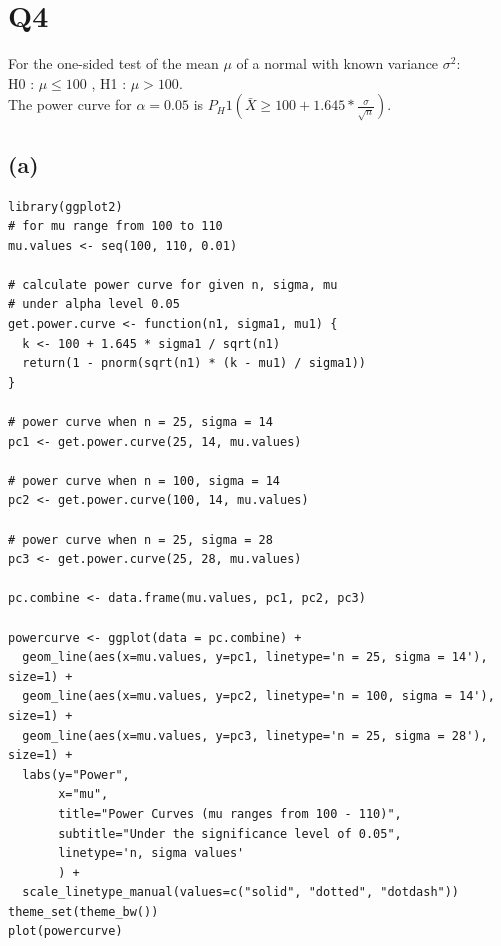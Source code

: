 \documentclass[12pt,letterpaper]{article}
\begin{document}

\section*{Q4 }
For the one-sided test of the mean $\mu$ of a normal with known variance $\sigma^2$: \\
H0 : $\mu \leq 100 $ , H1 : $\mu > 100$. \\
The power curve for $\alpha = 0.05$ is $P_H1(\bar{X} \geq 100 + 1.645 * \frac{\sigma}{\sqrt{n}})$.

\subsection*{(a)}
\begin{verbatim}
library(ggplot2)
# for mu range from 100 to 110
mu.values <- seq(100, 110, 0.01)

# calculate power curve for given n, sigma, mu
# under alpha level 0.05
get.power.curve <- function(n1, sigma1, mu1) {
  k <- 100 + 1.645 * sigma1 / sqrt(n1)
  return(1 - pnorm(sqrt(n1) * (k - mu1) / sigma1))
}

# power curve when n = 25, sigma = 14
pc1 <- get.power.curve(25, 14, mu.values)

# power curve when n = 100, sigma = 14
pc2 <- get.power.curve(100, 14, mu.values)

# power curve when n = 25, sigma = 28
pc3 <- get.power.curve(25, 28, mu.values)

pc.combine <- data.frame(mu.values, pc1, pc2, pc3)

powercurve <- ggplot(data = pc.combine) +
  geom_line(aes(x=mu.values, y=pc1, linetype='n = 25, sigma = 14'), size=1) +
  geom_line(aes(x=mu.values, y=pc2, linetype='n = 100, sigma = 14'), size=1) +
  geom_line(aes(x=mu.values, y=pc3, linetype='n = 25, sigma = 28'), size=1) +
  labs(y="Power", 
       x="mu", 
       title="Power Curves (mu ranges from 100 - 110)",
       subtitle="Under the significance level of 0.05",
       linetype='n, sigma values'
       ) +
  scale_linetype_manual(values=c("solid", "dotted", "dotdash"))
theme_set(theme_bw())
plot(powercurve)
\end{verbatim}
\end{document}
